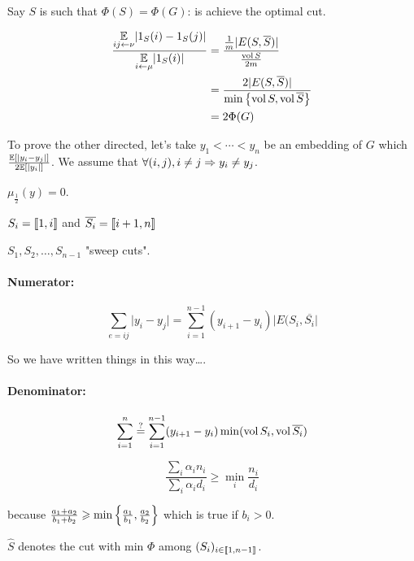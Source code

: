 Say $S$ is such that $\Phi(S) = \Phi(G)$: is achieve the optimal cut.

\[
    \begin{aligned}
        \frac{\underset{ij\leftarrow\nu}{\mathbb{E}}\lvert1_S(i)-1_S(j)\rvert}{\underset{i\leftarrow\mu}{\mathbb{E}}\lvert 1_S(i)\rvert} &= \frac{\frac{1}{m}\lvert E(S,\overline{S})\rvert}{\frac{\operatorname{vol} S}{2m}}\\
        &= \frac{2\lvert E(S,\overline{S}) \rvert}{\min\left\{ \operatorname{vol} S, \operatorname{vol} \overline{S} \right\}}\\
        &= 2 \Phi(G)
    \end{aligned}
\]

\bigskip

To prove the other directed, let's take $y_1 < \cdots < y_n$ be an embedding of $G$ which $\frac{\mathbb{E}\left[ \lvert y_i-y_j\rvert \right]}{2\mathbb{E}\left[ \lvert y_i \rvert \right]}$. We assume that $\forall (i,j), i\neq j \Rightarrow y_i \neq y_j$.

$\mu_{\frac{1}{2}}(y) = 0$.


\begin{notation}
    $S_i = \left\llbracket 1,i \right\rrbracket$ and $\overline{S_i} = \left\llbracket i+1,n \right\rrbracket$
\end{notation}

$S_1, S_2,\ldots, S_{n-1}$ "sweep cuts".

\paragraph{Numerator:}

\[
    \sum\limits_{e=ij} \lvert y_i-y_j \rvert = \sum\limits_{i=1}^{n-1} (y_{i+1} - y_i) \lvert E(S_i, \overline{S_i} \rvert
\]

So we have written things in this way\dots.

\paragraph{Denominator:}


\[
    \sum\limits_{i=1}^n \overset{?}{=} \sum\limits_{i=1}^{n-1} (y_{i+1} - y_i) \min(\operatorname{vol} S_i, \operatorname{vol} \overline{S_i})
\]

\[
    \frac{\sum\limits_i \alpha_i n_i}{\sum\limits_i \alpha_i d_i} \geqslant \min\limits_i \frac{n_i}{d_i}
\]

because $\frac{a_1+a_2}{b_1+b_2} \geqslant \min\left\{ \frac{a_1}{b_1},\frac{a_2}{b_2} \right\}$ which is true if $b_i > 0$.


$\hat{S}$ denotes the cut with min $\Phi$ among $(S_i)_{i\in\left\llbracket 1,n-1 \right\rrbracket}$.


